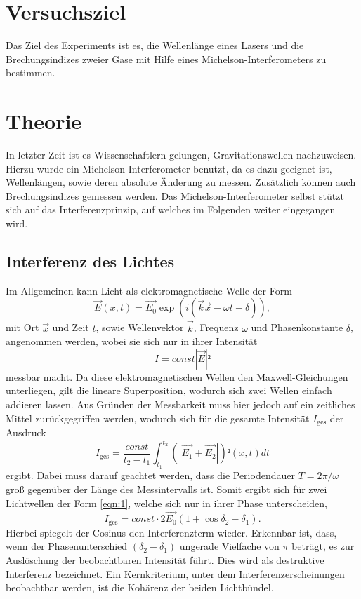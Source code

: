 \section{Versuchsziel}
\label{sec:Versuchsziel}
Das Ziel des Experiments ist es, die Wellenlänge eines Lasers und die Brechungsindizes zweier Gase mit Hilfe eines Michelson-Interferometers zu bestimmen.

\section{Theorie}
\label{sec:Theorie}

In letzter Zeit ist es Wissenschaftlern gelungen, Gravitationswellen nachzuweisen.
Hierzu wurde ein Michelson-Interferometer benutzt, da es dazu geeignet ist, Wellenlängen, sowie deren absolute Änderung zu messen.
Zusätzlich können auch Brechungsindizes gemessen werden.
Das Michelson-Interferometer selbst stützt sich auf das Interferenzprinzip, auf welches im Folgenden weiter eingegangen wird.\\
\subsection{Interferenz des Lichtes}
Im Allgemeinen kann Licht als elektromagnetische Welle der Form
\begin{equation}
  \vec{E}(x,t) = \vec{E_0}\exp{(i(\vec{k}\vec{x}-\omega t -\delta))}, \label{eqn:1}
\end{equation}
mit Ort $\vec{x}$ und Zeit $t$, sowie Wellenvektor $\vec{k}$, Frequenz $\omega$ und Phasenkonstante $\delta$, angenommen werden, wobei sie sich nur in ihrer Intensität
\begin{equation}
  I = const |\vec{E}|²
\end{equation}
messbar macht.
Da diese elektromagnetischen Wellen den Maxwell-Gleichungen unterliegen, gilt die lineare Superposition, wodurch sich zwei Wellen einfach addieren lassen.
Aus Gründen der Messbarkeit muss hier jedoch auf ein zeitliches Mittel zurückgegriffen werden, wodurch sich für die gesamte Intensität $I_{\text{ges}}$ der Ausdruck
\begin{equation}
  I_{\text{ges}} = \frac{const}{t_2-t_1} \int_{t_1}^{t_2} (|\vec{E_1}+\vec{E_2}|)²(x,t) dt
\end{equation}
ergibt. Dabei muss darauf geachtet werden, dass die Periodendauer $T = 2\pi/\omega$ groß gegenüber der Länge des Messintervalls ist.
Somit ergibt sich für zwei Lichtwellen der Form \eqref{eqn:1}, welche sich nur in ihrer Phase unterscheiden,
\begin{equation}
  I_{\text{ges}} = const \cdot 2\vec{E_0}(1+\cos{\delta_2-\delta_1}).
\end{equation}
Hierbei spiegelt der Cosinus den Interferenzterm wieder.
Erkennbar ist, dass, wenn der Phasenunterschied $(\delta_2-\delta_1)$ ungerade Vielfache von $\pi$ beträgt, es zur Auslöschung der beobachtbaren Intensität führt.
Dies wird als destruktive Interferenz bezeichnet.
Ein Kernkriterium, unter dem Interferenzerscheinungen beobachtbar werden, ist die Kohärenz der beiden Lichtbündel.\\

